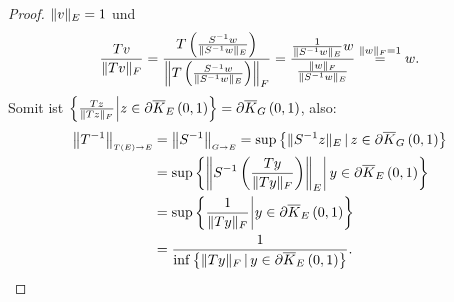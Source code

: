 \begin{proof}
$\lVert v\rVert_E = 1$ und
\[\frac{Tv}{\lVert Tv\rVert_F} = \frac{T\left(\frac{S^{-1} w}{\lVert S^{-1} w\rVert_E} \right)}{\left\|T\left(\frac{S^{-1} w}{\lVert S^{-1} w\rVert_E}\right)\right\|_F}
= \frac{\frac 1 {\lVert S^{-1} w\rVert_E} w}{\frac{\lVert w\rVert_F}{\lVert S^{-1} w\rVert_E}}
\overset{\lVert w\rVert _F=1} = w\text.\]
Somit ist
$\mengea{\frac{Tz}{\norm{Tz}_F}}{z \in \kran E 0 1} = \kran G01$, also:
\begin{align*}
\opnorm {T\inv}{T(E)}E & = \opnorm {S\inv} G E 
        = \sup\menge{\norm{S\inv z}_E}{z \in \kran G 0 1}\\
        &= \sup\mengea{\norma{S\inv \left(
                  \frac{Ty}{\norm{Ty}_F}
                  \right)}_E}{y \in \kran E 0 1}\\
        &= \sup\mengea{\frac 1 {\norm {Ty}_F}}{y \in \kran E 0 1}\\
        &= \frac 1 {\inf\menge{\norm {Ty}_F}{y \in \kran E 0 1}}\text.
\end{align*}
\end{proof}